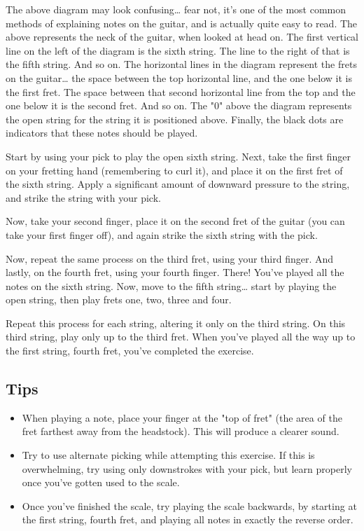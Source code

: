 The above diagram may look confusing\ldots{} fear not, it's one of the most common
methods of explaining notes on the guitar, and is actually quite easy to read.
The above represents the neck of the guitar, when looked at head on. The first
vertical line on the left of the diagram is the sixth string. The line to the
right of that is the fifth string. And so on. The horizontal lines in the
diagram represent the frets on the guitar\ldots{} the space between the top
horizontal line, and the one below it is the first fret. The space between that
second horizontal line from the top and the one below it is the second fret.
And so on. The "0" above the diagram represents the open string for the string
it is positioned above. Finally, the black dots are indicators that these notes
should be played.

Start by using your pick to play the open sixth string. Next, take the first
finger on your fretting hand (remembering to curl it), and place it on the
first fret of the sixth string. Apply a significant amount of downward pressure
to the string, and strike the string with your pick.

Now, take your second finger, place it on the second fret of the guitar (you
can take your first finger off), and again strike the sixth string with the
pick.

Now, repeat the same process on the third fret, using your third finger. And
lastly, on the fourth fret, using your fourth finger. There! You've played all
the notes on the sixth string. Now, move to the fifth string\ldots{} start by
playing the open string, then play frets one, two, three and four.

Repeat this process for each string, altering it only on the third string. On
this third string, play only up to the third fret. When you've played all the
way up to the first string, fourth fret, you've completed the exercise.

\subsection{Tips}
\begin{itemize}
\item When playing a note, place your finger at the "top of fret" (the area of
      the fret farthest away from the headstock). This will produce a clearer sound.
\item Try to use alternate picking while attempting this exercise. If this is
      overwhelming, try using only downstrokes with your pick, but learn properly
      once you've gotten used to the scale.
\item Once you've finished the scale, try playing the scale backwards, by
      starting at the first string, fourth fret, and playing all notes in exactly the
      reverse order.
\end{itemize}

